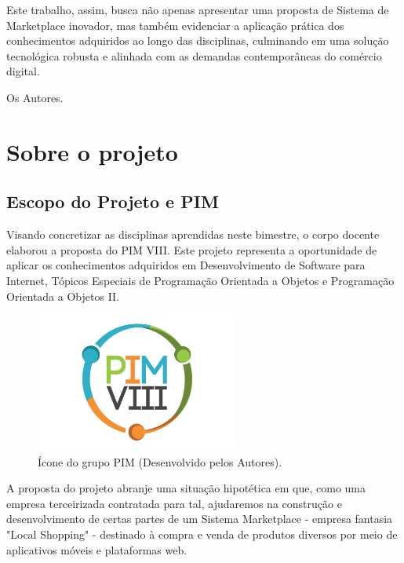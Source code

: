 \documentclass[
	12pt,				%
	openright,			%
	twoside,			%
	a4paper,			%
	english,			%
	brazil				%
	]{abntex2}
\begin{document}
Este trabalho, assim, busca não apenas apresentar uma proposta de Sistema de Marketplace inovador, mas também evidenciar a aplicação prática dos conhecimentos adquiridos ao longo das disciplinas, culminando em uma solução tecnológica robusta e alinhada com as demandas contemporâneas do comércio digital.

Os Autores.



\chapter{Sobre o projeto}\label{cap_introducao}

\section{Escopo do Projeto e PIM}

Visando concretizar as disciplinas aprendidas neste bimestre, o corpo docente elaborou a proposta do PIM VIII. Este projeto representa a oportunidade de aplicar os conhecimentos adquiridos em Desenvolvimento de Software para Internet, Tópicos Especiais de Programação Orientada a Objetos e Programação Orientada a Objetos II.

\begin{figure}[htb]
	\centering
	\includegraphics[width=0.6\textwidth]{img/PIM-VIII-LOGO}
	\caption{Ícone do grupo PIM (Desenvolvido pelos Autores).}
	\label{fig:logo-pim-viii}
\end{figure}

A proposta do projeto abranje uma situação hipotética em que, como uma empresa terceirizada contratada para tal, ajudaremos na construção e desenvolvimento de certas partes de um Sistema Marketplace - empresa fantasia "Local Shopping" -  destinado à compra e venda de produtos diversos por meio de aplicativos móveis e plataformas web.
\end{document}
